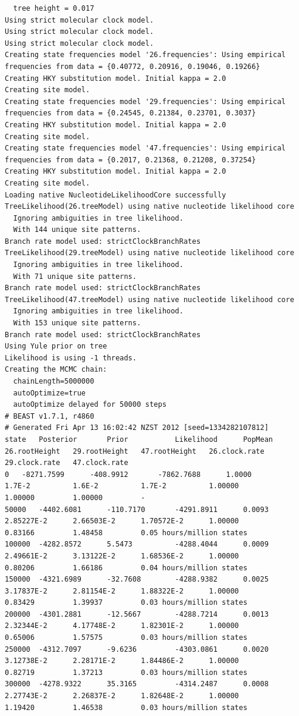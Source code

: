 \documentclass[12pt]{article}
\begin{document}
{\begin{verbatim}
  tree height = 0.017
Using strict molecular clock model.
Using strict molecular clock model.
Using strict molecular clock model.
Creating state frequencies model '26.frequencies': Using empirical frequencies from data = {0.40772, 0.20916, 0.19046, 0.19266}
Creating HKY substitution model. Initial kappa = 2.0
Creating site model.
Creating state frequencies model '29.frequencies': Using empirical frequencies from data = {0.24545, 0.21384, 0.23701, 0.3037}
Creating HKY substitution model. Initial kappa = 2.0
Creating site model.
Creating state frequencies model '47.frequencies': Using empirical frequencies from data = {0.2017, 0.21368, 0.21208, 0.37254}
Creating HKY substitution model. Initial kappa = 2.0
Creating site model.
Loading native NucleotideLikelihoodCore successfully 
TreeLikelihood(26.treeModel) using native nucleotide likelihood core
  Ignoring ambiguities in tree likelihood.
  With 144 unique site patterns.
Branch rate model used: strictClockBranchRates
TreeLikelihood(29.treeModel) using native nucleotide likelihood core
  Ignoring ambiguities in tree likelihood.
  With 71 unique site patterns.
Branch rate model used: strictClockBranchRates
TreeLikelihood(47.treeModel) using native nucleotide likelihood core
  Ignoring ambiguities in tree likelihood.
  With 153 unique site patterns.
Branch rate model used: strictClockBranchRates
Using Yule prior on tree
Likelihood is using -1 threads.
Creating the MCMC chain:
  chainLength=5000000
  autoOptimize=true
  autoOptimize delayed for 50000 steps
# BEAST v1.7.1, r4860
# Generated Fri Apr 13 16:02:42 NZST 2012 [seed=1334282107812]
state	Posterior   	Prior       	Likelihood  	PopMean     	26.rootHeight	29.rootHeight	47.rootHeight	26.clock.rate	29.clock.rate	47.clock.rate
0	-8271.7599  	-408.9912   	-7862.7688  	1.0000      	1.7E-2      	1.6E-2      	1.7E-2      	1.00000     	1.00000     	1.00000     	-
50000	-4402.6081  	-110.7170   	-4291.8911  	0.0093      	2.85227E-2  	2.66503E-2  	1.70572E-2  	1.00000     	0.83166     	1.48458     	0.05 hours/million states
100000	-4282.8572  	5.5473      	-4288.4044  	0.0009      	2.49661E-2  	3.13122E-2  	1.68536E-2  	1.00000     	0.80206     	1.66186     	0.04 hours/million states
150000	-4321.6989  	-32.7608    	-4288.9382  	0.0025      	3.17837E-2  	2.81154E-2  	1.88322E-2  	1.00000     	0.83429     	1.39937     	0.03 hours/million states
200000	-4301.2881  	-12.5667    	-4288.7214  	0.0013      	2.32344E-2  	4.17748E-2  	1.82301E-2  	1.00000     	0.65006     	1.57575     	0.03 hours/million states
250000	-4312.7097  	-9.6236     	-4303.0861  	0.0020      	3.12738E-2  	2.28171E-2  	1.84486E-2  	1.00000     	0.82719     	1.37213     	0.03 hours/million states
300000	-4278.9322  	35.3165     	-4314.2487  	0.0008      	2.27743E-2  	2.26837E-2  	1.82648E-2  	1.00000     	1.19420     	1.46538     	0.03 hours/million states


\end{verbatim}}
\end{document}
